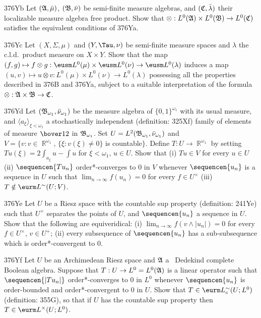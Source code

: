 {\spheader 376Yb
Let $(\frak A,\bar\mu)$, $(\frak B,\bar\nu)$ be semi-finite measure
algebras, and $(\frak C,\bar\lambda)$ their localizable measure algebra
free product.   Show that $\otimes:L^0(\frak A)\times L^0(\frak B)\to
L^0(\frak C)$ satisfies the equivalent conditions of 376Ya.

\spheader 376Yc Let $(X,\Sigma,\mu)$ and $(Y,\Tau,\nu)$ be semi-finite
measure spaces and $\lambda$ the c.l.d.\ product measure on $X\times Y$.
Show that the map $(f,g)\mapsto f\otimes g:
\eusm L^0(\mu)\times\eusm L^0(\nu)\to\eusm L^0(\lambda)$ induces a map
$(u,v)\mapsto u\otimes v:L^0(\mu)\times L^0(\nu)\to L^0(\lambda)$
possessing all the properties described in 376B and 376Ya, subject to
a suitable interpretation of the formula
$\otimes:\frak A\times\frak B\to\frak C$.

\spheader 376Yd Let $(\frak B_{\omega_1},\bar\nu_{\omega_1})$
be the measure algebra of
$\{0,1\}^{\omega_1}$ with its usual measure, and
$\langle a_{\xi}\rangle_{\xi<\omega_1}$ a stochastically independent
(definition:  325Xf) family
of elements of measure $\bover12$ in $\frak B_{\omega_1}$.   Set
$U=L^2(\frak B_{\omega_1},\bar\nu_{\omega_1})$ and
$V=\{v:v\in\BbbR^{\omega_1},\,\{\xi:v(\xi)\ne 0\}$ is
countable$\}$.   Define $T:U\to\BbbR^{\omega_1}$ by setting
$Tu(\xi)=2\int_{a_{\xi}}u-\int u$ for $\xi<\omega_1$, $u\in U$.     Show
that (i) $Tu\in V$ for every $u\in U$ (ii)
$\sequencen{Tu_n}$ order*-converges to $0$ in $V$ whenever
$\sequencen{u_n}$ is a sequence in $U$ such that
$\lim_{n\to\infty}f(u_n)=0$ for every $f\in U^{\times}$ (iii)
$T\notin\eurm L^{\sim}(U;V)$.

\spheader 376Ye Let $U$ be a Riesz space with the countable sup property
(definition:  241Ye)
such that $U^{\times}$ separates the points of $U$, and
$\sequencen{u_n}$ a sequence in $U$.   Show that the
following are equiveridical:  (i) $\lim_{n\to\infty}f(v\wedge|u_n|)=0$
for every $f\in U^{\times}$, $v\in U^+$;  (ii) every subsequence of
$\sequencen{u_n}$ has a
sub-subsequence which is order*-convergent to $0$.

\spheader 376Yf Let $U$ be an Archimedean Riesz space and $\frak A$ a
\wsid\ Dedekind complete Boolean algebra.   Suppose that $T:U\to
L^0=L^0(\frak A)$ is a linear operator such that
$\sequencen{|Tu_n|}$ order*-converges to $0$ in $L^0$ whenever
$\sequencen{u_n}$ is order-bounded and order*-convergent to $0$ in
$U$.   Show that $T\in\eurm L^{\sim}_c(U;L^0)$ (definition:  355G),
so that if $U$ has the
countable sup property then $T\in\eurm L^{\times}(U;L^0)$.

}

